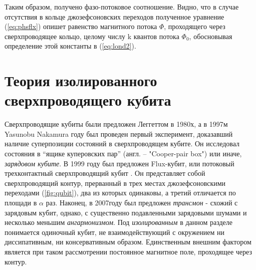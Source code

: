 \documentclass[12pt, twoside]{report}
\numberwithin{equation}{section}
\numberwithin{figure}{section}
\begin{document}
Таким образом, получено фазо-потоковое соотношение. Видно, что в случае отсутствия в кольце джозефсоновских переходов полученное уравнение (\ref{eq:phsflx}) опишет равенство магнитного потока $\Phi$, проходящего через сверхпроводящее кольцо, целому числу  k квантов потока $\Phi_0$, обосновывая определение этой константы в (\ref{eq:lond2}).


\section{Теория изолированного сверхпроводящего кубита}
Сверхпроводящие кубиты были предложен Леггеттом в 1980х, а в 1997м Yasunobu Nakamura году был проведен первый эксперимент, доказавший наличие суперпозиции состояний в сверхпроводящем кубите. Он исследовал состояния в ``ящике куперовских пар'' (англ. -- "Cooper-pair box") или иначе, \textit{зарядовом кубите}. В 1999 году был предложен Flux-кубит, или потоковый трехконтактный сверхпроводящий кубит \cite{Orlando1999}. Он представляет собой сверхпроводящий контур, прерванный в трех местах джозефсоновскими переходами (\autoref{fig:qubit}), два из которых одинаковы, а третий отличается по площади в $\alpha$ раз. Наконец, в 2007году был предложен \cite{Koch2007} \textit{трансмон} - схожий с зарядовым кубит, однако, с существенно подавленными зарядовыми шумами и несколько меньшим \textit{ангармонизмом}. 
Под \textit{изолированным} в данном разделе понимается одиночный кубит, не взаимодействующий с окружением ни диссипативным, ни консервативным образом. Единственным внешним фактором является при таком рассмотрении постоянное магнитное поле, проходящее через контур.
\end{document}
